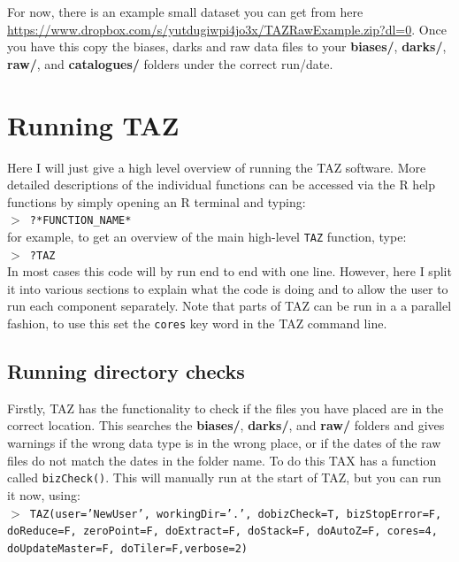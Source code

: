 \documentclass[12pt]{article}
\begin{document}
For now, there is an example small dataset you can get from here \url{https://www.dropbox.com/s/yutdugiwpi4jo3x/TAZRawExample.zip?dl=0}. Once you have this copy the biases, darks and raw data files to your \textbf{biases/}, \textbf{darks/}, \textbf{raw/}, and \textbf{catalogues/} folders under the correct run/date.  

\section{Running TAZ}

Here I will just give a high level overview of running the TAZ software. More detailed descriptions of the individual functions can be accessed via the R help functions by simply opening an R terminal and typing: \\

\hspace{10mm}  \texttt{$>$ ?*FUNCTION\_NAME*}\\

for example, to get an overview of the main high-level \texttt{TAZ} function, type:\\

\hspace{10mm}  \texttt{$>$ ?TAZ}\\

In most cases this code will by run end to end with one line. However, here I split it into various sections to explain what the code is doing and to allow the user to run each component separately. Note that parts of TAZ can be run in a a parallel fashion, to use this set the \texttt{cores} key word in the TAZ command line.

\subsection{Running directory checks}

Firstly, TAZ has the functionality to check if the files you have placed are in the correct location. This searches the \textbf{biases/}, \textbf{darks/}, and \textbf{raw/} folders and gives warnings if the wrong data type is in the wrong place, or if the dates of the raw files do not match the dates in the folder name. To do this TAX has a function called \texttt{bizCheck()}. This will manually run at the start of TAZ, but you can run it now, using:\\


\hspace{10mm} \texttt{$>$ TAZ(user='NewUser', workingDir='.', dobizCheck=T, bizStopError=F, doReduce=F,  zeroPoint=F, doExtract=F, doStack=F, doAutoZ=F, cores=4, doUpdateMaster=F, doTiler=F,verbose=2)}\\
\end{document}
